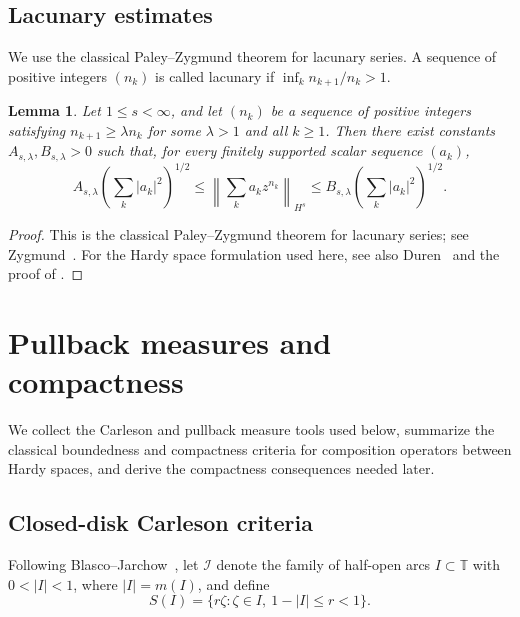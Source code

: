 \documentclass[10pt,a4paper]{amsart}
\newtheorem{lemma}[theorem]{Lemma}
\newcommand{\T}{\mathbb{T}}
\begin{document}
\subsection{Lacunary estimates}

We use the classical Paley--Zygmund theorem for lacunary series.  A sequence of
positive integers \((n_k)\) is called lacunary if
\(\inf_k n_{k+1}/n_k>1\).

\begin{lemma}
\label{lem:paley}
Let \(1\le s<\infty\), and let \((n_k)\) be a sequence of positive
integers satisfying \(n_{k+1}\ge\lambda n_k\) for some \(\lambda>1\)
and all \(k\ge1\).  Then there exist constants
\(A_{s,\lambda},B_{s,\lambda}>0\) such that, for every finitely
supported scalar sequence \((a_k)\),
\[
        A_{s,\lambda}
        \left(\sum_k|a_k|^2\right)^{1/2}
        \le
        \left\|\sum_k a_kz^{n_k}\right\|_{H^s}
        \le
        B_{s,\lambda}
        \left(\sum_k|a_k|^2\right)^{1/2}.
\]
\end{lemma}

\begin{proof}
This is the classical Paley--Zygmund theorem for lacunary series; see
Zygmund~\cite[Vol.~I, Ch.~V, Theorem~8.20]{Zygmund2002}.
For the Hardy space formulation used here, see also
Duren~\cite[p.~104]{Duren1970} and the proof of
\cite[Proposition~3.2]{LNST2017}.
\end{proof}






\section{Pullback measures and compactness}
\label{sec:pullback}

We collect the Carleson and pullback measure tools used below,
summarize the classical boundedness and compactness criteria for
composition operators between Hardy spaces, and derive the compactness
consequences needed later.

\subsection{Closed-disk Carleson criteria}
\label{subsec:carleson}

Following Blasco--Jarchow~\cite{BlascoJarchow2005}, let
\(\mathcal I\) denote the family of half-open arcs \(I\subset\T\) with
\(0<|I|<1\), where \(|I|=m(I)\), and define
\[
        S(I)
        =
        \{r\zeta:\zeta\in I,\ 1-|I|\le r<1\}.
\]
\end{document}
